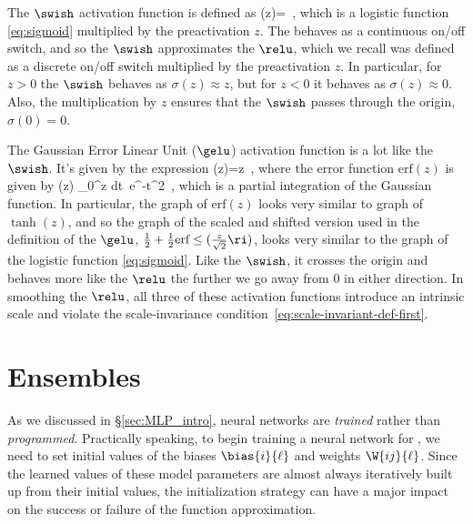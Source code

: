 \item The $\swish$ activation function \cite{ramachandran2017searching} is defined as  
\be
\sigma(z)=\, ,
\ee
which is a logistic function \eqref{eq:sigmoid} multiplied by the preactivation $z$. The  behaves as a continuous on/off switch, and so the $\swish$ approximates the $\relu$, which we recall was defined as a discrete on/off switch multiplied by the preactivation $z$. In particular, for $z>0$ the $\swish$ behaves as $\sigma(z) \approx z$, but for $z<0$ it behaves as $\sigma(z) \approx 0$. Also, the multiplication by $z$ ensures that the $\swish$ passes through the origin, $\sigma(0) = 0$.
\item The Gaussian Error Linear Unit ($\gelu$) 
activation function \cite{hendrycks2016gaussian} is a lot like  the $\swish$. It's given by the expression
\be
\sigma(z)=\times z\, ,
\ee
where the error function $\text{erf}(z)$ is given by
\be
{}(z) \equiv {} \int_0^z dt\, e^{-t^2}\, ,%
\ee
which is a partial integration of the Gaussian function.
In particular, the graph of $\text{erf}(z)$ looks very similar to graph of $\tanh(z)$, and so the graph of the scaled and shifted version used in the definition of the $\gelu$, $\frac{1}{2}+\frac{1}{2}\text{erf}\le(\frac{z}{\sqrt{2}}\ri)$, looks very similar to the graph of the logistic function \eqref{eq:sigmoid}. 
Like the $\swish$, it crosses the origin and behaves more like the $\relu$ the further we go away from $0$ in either direction.
\ei
In smoothing the $\relu$, all three of these activation functions introduce an intrinsic scale and violate the scale-invariance condition~\eqref{eq:scale-invariant-def-first}.







\section{Ensembles}\label{sec:MLP_distribution}


As we discussed in \S\ref{sec:MLP_intro}, neural networks are \emph{trained} rather than \emph{programmed}.
Practically speaking, to begin
training a neural network for , we need to set initial values of the biases $\bias{i}{\ell}$ and weights $\W{ij}{\ell}$. 
Since the learned values of these model parameters are almost always iteratively built up from their initial values, the initialization strategy can
have a major impact on the success or failure of the function approximation.

